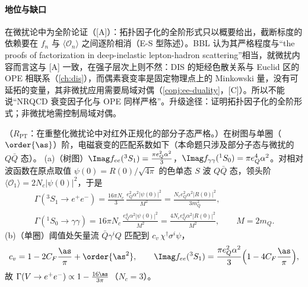 \paragraph{地位与缺口}
在微扰论中为全阶论证（[A]）：拓扑因子化的全阶形式只以概要给出，截断标度的依赖要在 $f_n$ 与 $\langle\mathcal O_n\rangle$ 之间逐阶相消（E-S 型陈述）。BBL 认为其严格程度与“the proofs of factorization in deep-inelastic lepton-hadron scattering”相当\cite[第~VI.A~节]{BodwinBraatenLepage1995}，就微扰内容而言这与 [A] 一致，在强子层次上则不然：DIS 的矩经色散关系与 Euclid 区的 OPE 相联系（\cref{ch:dis}），而偶素衰变率是固定物理点上的 Minkowski 量，没有可延拓的变量，其非微扰应用需要局域对偶（\cref{conj:ee-duality}，[C]）。所以不能说“NRQCD 衰变因子化与 OPE 同样严格”。升级途径：证明拓扑因子化的全阶形式；非微扰地需控制局域对偶。


\begin{proposition}\label{prop:heavy-nrqcd-matching}
（$R_{\mathrm{PT}}$：在重整化微扰论中对红外正规化的部分子态严格。）在树图与单圈（$\order{\as}$）阶，电磁衰变的匹配系数如下（本命题只涉及部分子态与微扰的 $Q\bar Q$ 态）。
(a)（树图）$\Imag f_{ee}({}^3S_1)=\frac{\pi e_Q^2\alpha^2}{3}$，$\Imag f_{\gamma\gamma}({}^1S_0)=\pi e_Q^4\alpha^2$。对相对波函数在原点取值 $\psi(0)=R(0)/\sqrt{4\pi}$ 的色单态 $S$ 波 $Q\bar Q$ 态，领头阶 $\langle\mathcal O_1\rangle=2N_c|\psi(0)|^2$，于是
\begin{equation}\label{eq:heavy-EMwidths}
\begin{gathered}
\Gamma({}^3S_1\to e^+e^-)=\frac{16\pi N_c}{3}\,\frac{e_Q^2\alpha^2|\psi(0)|^2}{M^2}=\frac{N_ce_Q^2\alpha^2|R(0)|^2}{3m_Q^2},\\
\Gamma({}^1S_0\to\gamma\gamma)=16\pi N_c\,\frac{e_Q^4\alpha^2|\psi(0)|^2}{M^2}=\frac{4N_ce_Q^4\alpha^2|R(0)|^2}{M^2},\qquad M=2m_Q .
\end{gathered}
\end{equation}
(b)（单圈）阈值处矢量流 $\bar Q\gamma^iQ$ 匹配到 $c_v\,\chi^\dagger\sigma^i\psi$，
\begin{equation}\label{eq:heavy-cv}
c_v=1-2C_F\frac{\as}{\pi}+\order{\as^2},\qquad
\Imag f_{ee}({}^3S_1)=\frac{\pi e_Q^2\alpha^2}{3}\Big(1-4C_F\frac{\as}{\pi}\Big),
\end{equation}
故 $\Gamma(V\to e^+e^-)\propto1-\frac{16\as}{3\pi}$（$N_c=3$）。
\end{proposition}

